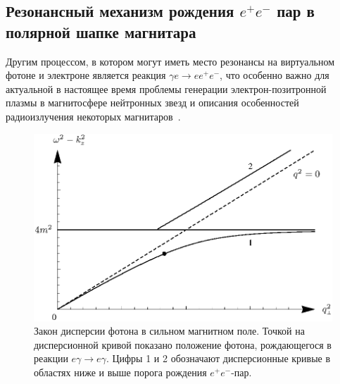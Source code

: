 \subsection{Резонансный механизм рождения $e^+e^-$ пар  в полярной шапке магнитара}
Другим процессом, в котором могут иметь место резонансы на виртуальном фотоне и электроне является реакция $\gamma e \to e e^+e^-$, что особенно важно для актуальной в настоящее время  
проблемы генерации электрон-позитронной плазмы в магнитосфере нейтронных звезд и описания особенностей 
радиоизлучения некоторых магнитаров~\cite{Malofeev:2005r, Malofeev:2005,
Duncan:1995,Thompson:1996,Thompson:2002}.  


%
\begin{figure}
\centerline{
\includegraphics[width=12cm]{fig5_3.eps}}
\caption{ Закон дисперсии фотона в сильном магнитном поле. 
Точкой на дисперсионной кривой 
показано положение фотона, рождающегося в реакции  $e \gamma \to e \gamma$.
 Цифры 1 и 2 обозначают дисперсионные кривые в областях ниже и выше 
порога рождения $e^+e^-$-пар.}
\label{fig:dispersion}
\end{figure}

